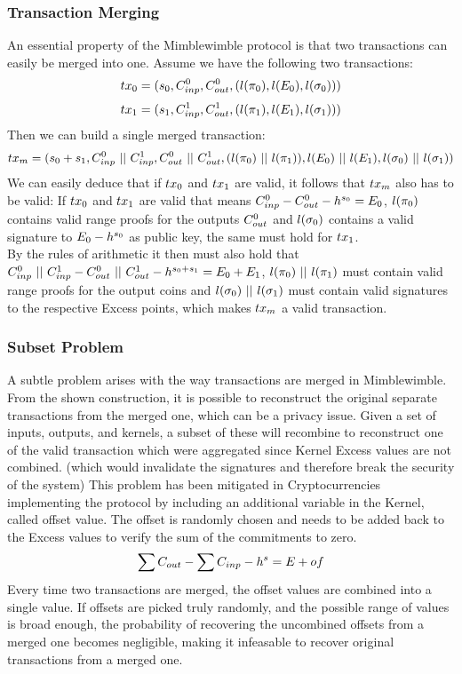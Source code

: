 \subsubsection{Transaction Merging}
An essential property of the Mimblewimble protocol is that two transactions can easily be merged into one. Assume we have the following two transactions:
\[ tx_0 = (s_0, C_{inp}^0, C_{out}^0, (l(\pi_0), l(E_0), l(\sigma_0)) ) \]
\[ tx_1 = (s_1, C_{inp}^1, C_{out}^1, (l(\pi_1), l(E_1), l(\sigma_1)) ) \]
Then we can build a single merged transaction:
\[ tx_m = (s_0 + s_1, C_{inp}^0 ~||~ C_{inp}^1, C_{out}^0 ~||~ C_{out}^1, (l(\pi_0) ~||~ l(\pi_1)),
l(E_0) ~||~ l(E_1), l(\sigma_0) ~||~ l(\sigma_1)) \]
We can easily deduce that if $tx_0$ and $tx_1$ are valid, it follows that $tx_m$ also has to be valid:
If $tx_0$ and $tx_1$ are valid that means $C_{inp}^0 - C_{out}^0 - h^{s_0} = E_0$, $l(\pi_0)$ contains valid range proofs for the outputs
$C_{out}^0$ and $l(\sigma_0)$ contains a valid signature to $E_0 - h^{s_0}$ as public key, the same must hold for $tx_1$. \\
By the rules of arithmetic it then must also hold that $C_{inp}^0 ~||~ C_{inp}^1 - C_{out}^0 ~||~ C_{out}^1 - h^{s_0 + s_1} = E_0 + E_1$, $l(\pi_0) ~||~ l(\pi_1)$ must contain valid range proofs
for the output coins and $l(\sigma_0) ~||~ l(\sigma_1)$ must contain valid signatures to the respective Excess points, which makes $tx_m$ a valid transaction.

\subsubsection{Subset Problem}
A subtle problem arises with the way transactions are merged in Mimblewimble. From the shown construction, it is possible to reconstruct the original separate transactions from the merged one,
which can be a privacy issue.  Given a set of inputs, outputs, and kernels, a subset of these will recombine to reconstruct one of the valid transaction which were aggregated since Kernel Excess values are not combined.
(which would invalidate the signatures and therefore break the security of the system) This problem has been mitigated in Cryptocurrencies implementing the protocol by including an
additional variable in the Kernel, called offset value. The offset is randomly chosen and needs to be added back to the Excess values to verify the sum of the commitments to zero.
\[ \sum{C_{out}} - \sum C_{inp} - h^{s} = E + of\]
Every time two transactions are merged, the offset values are combined into a single value. If offsets are picked truly randomly, and the possible range of values is broad enough, the probability of recovering the
uncombined offsets from a merged one becomes negligible, making it infeasable to recover original transactions from a merged one.

